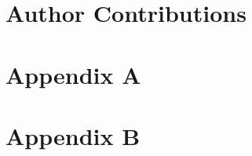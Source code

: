 \documentclass[10pt,a4paper,twocolumn]{article}
\begin{document}
\newpage
\section{Author Contributions}


\newpage
\printbibliography

\newpage
\appendix
\onecolumn
\section{Appendix A}

\section{Appendix B}

\end{document}
